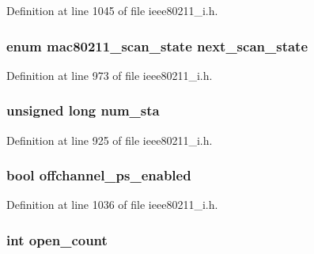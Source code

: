 Definition at line 1045 of file ieee80211\-\_\-i.\-h.

\hypertarget{structieee80211__local_a16e86195a99d4318403d3df1b82adf53}{
\subsubsection[{next\-\_\-scan\-\_\-state}]{\setlength{\rightskip}{0pt plus 5cm}enum {\bf mac80211\-\_\-scan\-\_\-state} next\-\_\-scan\-\_\-state}}\label{structieee80211__local_a16e86195a99d4318403d3df1b82adf53}


Definition at line 973 of file ieee80211\-\_\-i.\-h.

\hypertarget{structieee80211__local_a24328b32806c8eb5a960e0ed36a4b4f3}{
\subsubsection[{num\-\_\-sta}]{\setlength{\rightskip}{0pt plus 5cm}unsigned long num\-\_\-sta}}\label{structieee80211__local_a24328b32806c8eb5a960e0ed36a4b4f3}


Definition at line 925 of file ieee80211\-\_\-i.\-h.

\hypertarget{structieee80211__local_a6d0fffdd77c973b707ec9e1955744f88}{
\subsubsection[{offchannel\-\_\-ps\-\_\-enabled}]{\setlength{\rightskip}{0pt plus 5cm}bool offchannel\-\_\-ps\-\_\-enabled}}\label{structieee80211__local_a6d0fffdd77c973b707ec9e1955744f88}


Definition at line 1036 of file ieee80211\-\_\-i.\-h.

\hypertarget{structieee80211__local_a8943f3ee2b248b1fe911c0441c136c08}{
\subsubsection[{open\-\_\-count}]{\setlength{\rightskip}{0pt plus 5cm}int open\-\_\-count}}\label{structieee80211__local_a8943f3ee2b248b1fe911c0441c136c08}


